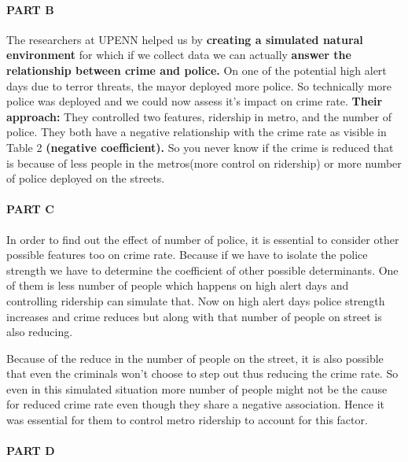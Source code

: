 \documentclass[
]{article}
\begin{document}
\hypertarget{part-b-8}{%
\paragraph{\texorpdfstring{{PART B}}{PART B}}\label{part-b-8}}

The researchers at UPENN helped us by \textbf{creating a simulated
natural environment} for which if we collect data we can actually
\textbf{answer the relationship between crime and police.} On one of the
potential high alert days due to terror threats, the mayor deployed more
police. So technically more police was deployed and we could now assess
it's impact on crime rate. \textbf{Their approach:} They controlled two
features, ridership in metro, and the number of police. They both have a
negative relationship with the crime rate as visible in Table 2
\textbf{(negative coefficient).} So you never know if the crime is
reduced that is because of less people in the metros(more control on
ridership) or more number of police deployed on the streets.

\hypertarget{part-c-8}{%
\paragraph{\texorpdfstring{{PART C}}{PART C}}\label{part-c-8}}

In order to find out the effect of number of police, it is essential to
consider other possible features too on crime rate. Because if we have
to isolate the police strength we have to determine the coefficient of
other possible determinants. One of them is less number of people which
happens on high alert days and controlling ridership can simulate that.
Now on high alert days police strength increases and crime reduces but
along with that number of people on street is also reducing.

Because of the reduce in the number of people on the street, it is also
possible that even the criminals won't choose to step out thus reducing
the crime rate. So even in this simulated situation more number of
people might not be the cause for reduced crime rate even though they
share a negative association. Hence it was essential for them to control
metro ridership to account for this factor.

\hypertarget{part-d-4}{%
\paragraph{\texorpdfstring{{PART D}}{PART D}}\label{part-d-4}}
\end{document}
